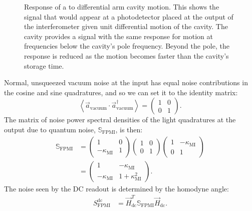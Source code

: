 \begin{figure}
  \centering
  
  \caption[Response of a \FPMI{} to differential arm cavity motion]{\label{fig:fp-mich-response}Response of a \FPMI{} to differential arm cavity motion. This shows the signal that would appear at a photodetector placed at the output of the interferometer given unit differential motion of the cavity. The cavity provides a signal with the same response for motion at frequencies below the cavity's pole frequency. Beyond the pole, the response is reduced as the motion becomes faster than the cavity's storage time.}
\end{figure}

Normal, unsqueezed vacuum noise at the input has equal noise contributions in the cosine and sine quadratures, and so we can set it to the identity matrix:
\begin{equation}
  \label{eq:unsqueezed-vacuum-amplitude}
  \left< \vec{a}_{\text{vacuum}} \cdot \vec{a}_{\text{vacuum}}^{\dag} \right> =
  \begin{pmatrix}
   1 & 0 \\
   0 & 1
  \end{pmatrix}.
\end{equation}
The matrix of noise power spectral densities of the light quadratures at the output due to quantum noise, $\mathbb{S}_{\text{FPMI}}$, is then:
\begin{equation}
  \begin{split}
    \mathbb{S}_{\text{FPMI}} &=
    \begin{pmatrix}
      1 & 0 \\
      -\kappa_{\text{MI}} & 1
    \end{pmatrix}
    \begin{pmatrix}
      1 & 0 \\
      0 & 1
    \end{pmatrix}
    \begin{pmatrix}
      1 & -\kappa_{\text{MI}} \\
      0 & 1
    \end{pmatrix} \\
    &=
    \begin{pmatrix}
      1 & -\kappa_{\text{MI}} \\
      -\kappa_{\text{MI}} & 1 + \kappa^2_{\text{MI}}
    \end{pmatrix}.
  \end{split}
\end{equation}
The noise seen by the \gls{DC} readout is determined by the homodyne angle:
\begin{equation}
  \begin{split}
    S_{\text{FPMI}}^{\text{dc}} &= \vec{H}_{\text{dc}}^{T} \mathbb{S}_{\text{FPMI}} \vec{H}_{\text{dc}}.
  \end{split}
\end{equation}

